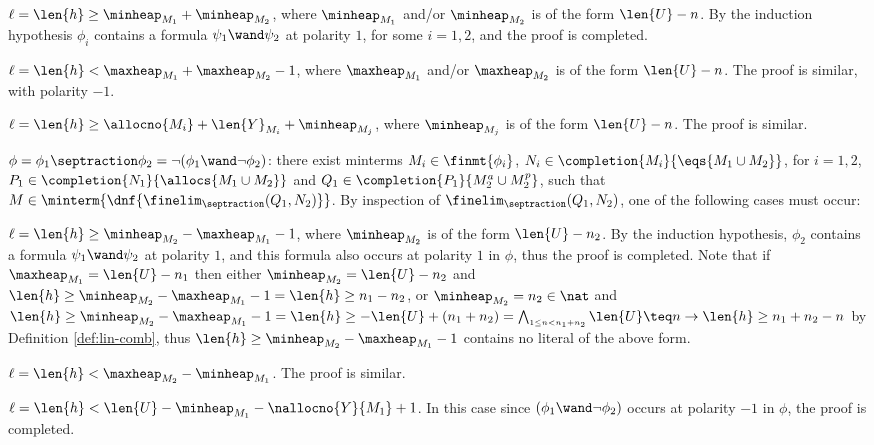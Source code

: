 {\begin{compactitem}
\begin{compactitem}
    \item $\ell = \len{h} \geq \minheap_{M_1} + \minheap_{M_2}$, where
      $\minheap_{M_1}$ and/or $\minheap_{M_2}$ is of the form
      $\len{U}-n$. By the induction hypothesis $\phi_i$ contains a
      formula $\psi_1 \wand \psi_2$ at polarity $1$, for some $i=1,2$,
      and the proof is completed.
    \item $\ell = \len{h} < \maxheap_{M_1} + \maxheap_{M_2} -1$, where
      $\maxheap_{M_1}$ and/or $\maxheap_{M_2}$ is of the form
      $\len{U}-n$. The proof is similar, with polarity $-1$.
    \item $\ell = \len{h} \geq \allocno{M_i} + \len{Y}_{M_i} +
      \minheap_{M_j}$, where $\minheap_{M_j}$ is of the form
      $\len{U}-n$. The proof is similar.
    \end{compactitem}
  \item $\phi = \phi_1\septraction\phi_2 =
    \neg(\phi_1\wand\neg\phi_2)$: there exist minterms $M_i \in
    \finmt{\phi_i}$, $N_i \in \completion{M_i}{\eqs{M_1 \cup M_2}}$, for
    $i=1,2$, $P_1 \in \completion{N_1}{\allocs{M_1 \cup M_2}}$ and
    $Q_1 \in \completion{P_1}{M_2^a \cup M_2^p}$, such that $M \in
    \minterm{\dnf{\finelim_\septraction(Q_1,N_2)}}$. By inspection of
    $\finelim_\septraction(Q_1,N_2)$, one of the following cases must
    occur:\begin{compactitem}
    \item $\ell=\len{h} \geq \minheap_{M_2} - \maxheap_{M_1} - 1$,
      where $\minheap_{M_2}$ is of the form $\len{U}-n_2$. By the
      induction hypothesis, $\phi_2$ contains a formula $\psi_1 \wand
      \psi_2$ at polarity $1$, and this formula also occurs at
      polarity $1$ in $\phi$, thus the proof is completed. Note that
      if $\maxheap_{M_1} = \len{U}-n_1$ then either $\minheap_{M_2} =
      \len{U}-n_2$ and $\len{h} \geq \minheap_{M_2} - \maxheap_{M_1} -
      1 = \len{h} \geq n_1-n_2$, or $\minheap_{M_2} = n_2 \in \nat$
      and $\len{h} \geq \minheap_{M_2} - \maxheap_{M_1} - 1 = \len{h}
      \geq -\len{U} + (n_1+n_2) = \bigwedge_{\scriptscriptstyle{1 \leq
          n < n_1+n_2}} \len{U} \teq n \rightarrow \len{h} \geq
      n_1+n_2-n$ by Definition \ref{def:lin-comb}, thus $\len{h} \geq \minheap_{M_2} - \maxheap_{M_1} -
      1$ contains no literal of the above form.
    \item $\ell = \len{h} < \maxheap_{M_2} - \minheap_{M_1}$. The
      proof is similar.
    \item $\ell = \len{h} < \len{U} - \minheap_{M_1} -
      \nallocno{Y}{M_1} + 1$. In this case since $(\phi_1 \wand \neg
      \phi_2)$ occurs at polarity $-1$ in $\phi$, the proof is
      completed.
    \end{compactitem}
  \end{compactitem}

}
